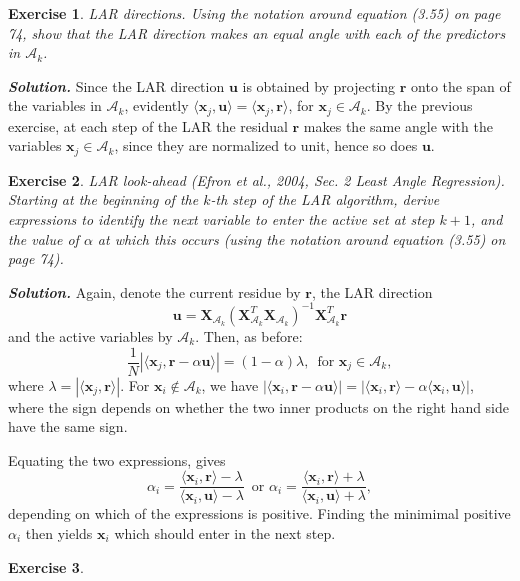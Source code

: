 \documentclass[12pt]{article}
\def\cA{\mathcal{A}}
\def\bx{\textbf{x}}
\def\bX{\textbf{X}}
\def\bu{\textbf{u}}
\def\br{\textbf{r}}
\newtheorem{exercise}{Exercise}[section]
\newenvironment{solution}[1][\it{Solution}]{\textbf{#1. } }{\vspace{.5cm}}
\begin{document}
\begin{exercise}
\textit{LAR directions}. Using the notation around equation (3.55) on page 74, show that the LAR direction makes an equal angle with each of the predictors in $\cA_k$.	
\end{exercise}
\begin{solution}
 Since the LAR direction $\bu$ is obtained by projecting $\br$ onto the span of the variables in $\cA_k$, evidently $\langle \bx_j, \bu \rangle = \langle \bx_j, \br \rangle$, for $\bx_j \in \cA_k$. By the previous exercise, at each step of the LAR the residual $\br$ makes the same angle with the variables $\bx_j \in \cA_k$, since they are normalized to unit, hence so does $\bu$.
\end{solution}

\begin{exercise}
LAR look-ahead (Efron et al., 2004, Sec. 2 Least Angle Regression). Starting at the beginning of the $k$-th step of the LAR algorithm, derive expressions to identify the next variable to enter the active set at step $k+1$, and the value of $\alpha$ at which this occurs (using the notation around equation (3.55) on page 74).	
\end{exercise} 

\begin{solution}
Again, denote the current residue by $\br$, the LAR direction $$\bu = \bX_{\cA_k}(\bX_{\cA_k}^T\bX_{\cA_k})^{-1} \bX_{\cA_k}^T \br$$
and the active variables by $\cA_k$. Then, as before:
$$\frac{1}{N}|\langle \bx_j, \br - \alpha \bu\rangle| = (1-\alpha)\lambda, \, \text{ for } {\bx}_j \in \cA_k,$$
where $\lambda = |\langle \bx_j, \br \rangle|$. For $\bx_i \notin \cA_k$, we have $|\langle \bx_i, \br -\alpha \bu\rangle| = |\langle \bx_i, \br \rangle - \alpha \langle \bx_i,\bu\rangle|$, where the sign depends on whether the two inner products on the right hand side have the same sign. 

Equating the two expressions, gives 
$$\alpha_i = \frac{\langle \bx_i, \br  \rangle -\lambda}{\langle \bx_i, \bu  \rangle -\lambda} \, \text{ or } \alpha_i = \frac{\langle \bx_i, \br  \rangle +\lambda}{\langle \bx_i, \bu  \rangle +\lambda},$$
depending on which of the expressions is positive. Finding the minimimal positive $\alpha_i$ then yields $\bx_i$ which should enter in the next step.
\end{solution}

\begin{exercise}
	
\end{exercise}
\end{document}

